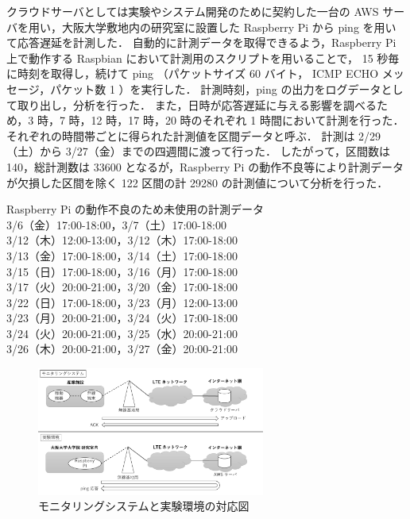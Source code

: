 \documentclass[technicalreport]{ieicej}
\begin{document}
クラウドサーバとしては実験やシステム開発のために契約した一台の AWS サーバを用い，大阪大学敷地内の研究室に設置した Raspberry Pi から ping を用いて応答遅延を計測した．
自動的に計測データを取得できるよう，Raspberry Pi 上で動作する Raspbian において計測用のスクリプトを用いることで， 15 秒毎に時刻を取得し，続けて ping （パケットサイズ 60 バイト， ICMP ECHO メッセージ，パケット数 1 ）を実行した．
計測時刻，ping の出力をログデータとして取り出し，分析を行った．
また，日時が応答遅延に与える影響を調べるため，3 時，7 時，12 時，17 時，20 時のそれぞれ 1 時間において計測を行った．
それぞれの時間帯ごとに得られた計測値を区間データと呼ぶ．
計測は 2/29（土）から 3/27（金）までの四週間に渡って行った．
したがって，区間数は 140，総計測数は 33600 となるが，Raspberry Pi の動作不良等により計測データが欠損した区間を除く 122 区間の計 29280 の計測値について分析を行った．
\begin{center}
Raspberry Pi の動作不良のため未使用の計測データ\\
3/6（金）17:00-18:00，3/7（土）17:00-18:00\\
3/12（木）12:00-13:00，3/12（木）17:00-18:00\\
3/13（金）17:00-18:00，3/14（土）17:00-18:00\\
3/15（日）17:00-18:00，3/16（月）17:00-18:00\\
3/17（火）20:00-21:00，3/20（金）17:00-18:00\\
3/22（日）17:00-18:00，3/23（月）12:00-13:00\\
3/23（月）20:00-21:00，3/24（火）17:00-18:00\\
3/24（火）20:00-21:00，3/25（水）20:00-21:00\\
3/26（木）20:00-21:00，3/27（金）20:00-21:00\\
\end{center}
\begin{figure}[tb]
\centering
\includegraphics[width=7.5cm]{experiment.pdf}
\caption{モニタリングシステムと実験環境の対応図}
\label{exp}
\end{figure}
\end{document}
